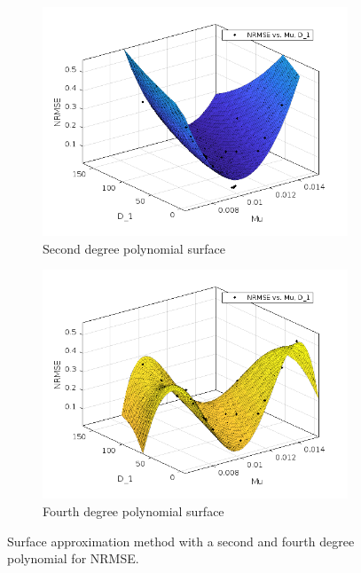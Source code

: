 \begin{figure}
    \centering
    \begin{subfigure}[b]{0.45\textwidth}
    \centering
    \includegraphics[width=\textwidth]{Images/ifem/MATLAB/NRMSE2poly.png}
    \caption{Second degree polynomial surface}
    \label{fig:poly2NRMSE}
    \end{subfigure}
    \hfill
    \begin{subfigure}[b]{0.45\textwidth}
    \centering
    \includegraphics[width=\textwidth]{Images/ifem/MATLAB/NRMSE4poly.png}
    \caption{Fourth degree polynomial surface}
    \label{fig:poly4NRMSE}
    \end{subfigure}
    \hspace{0.3cm}
    \caption[Polynomial approximation surfaces-NRMSE]{Surface approximation method with a second and fourth degree polynomial for NRMSE.}
    \label{fig:poly2and4}
\end{figure}
